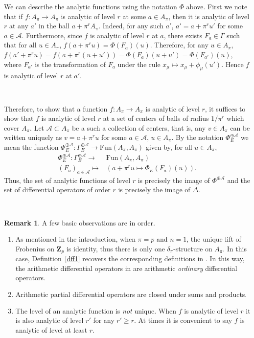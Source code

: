 \documentclass[10pt]{amsart}
\theoremstyle{Theorem}
\theoremstyle{definition}
\newtheorem{rmk}[thm]{Remark}
\newcommand{\ZZ}{\mathbf Z}
\newcommand{\cA}{\mathcal{A}}
\renewcommand{\d}{\delta}
\begin{document}
We can describe the analytic functions using the notation $\Phi$ above.  First we note that if $f\colon A_\pi\to A_\pi$ is analytic of level $r$ at some $a\in A_\pi$, then it is analytic of level $r$ at any $a'$ in the ball $a + \pi^rA_\pi$.  Indeed, for any such $a'$, $a' = a+ \pi^r u'$ for some $a\in \cA$.  Furthermore, since $f$ is analytic of level $r$ at $a$, there exists $F_a\in \Gamma$ such that for all $u\in A_\pi$, $f(a+\pi^r u) = \Phi(F_a)(u)$.  Therefore, for any $u\in A_\pi$, $f(a'+\pi^r u) = f(a+\pi^r(u + u')) = \Phi(F_a)(u + u') = \Phi(F_{a'})(u)$, where $F_{a'}$ is the transformation of $F_a$ under the rule $x_\mu \mapsto x_\mu + \phi_\mu(u')$.  Hence $f$ is analytic of level $r$ at $a'$.

\ 

Therefore, to show that a function $f:A_\pi\to A_\pi$ is analytic of level $r$, it suffices to show that $f$ is analytic of level $r$ at a set of centers of balls of radius $1/\pi^r$ which cover $A_\pi$.  Let $\cA\subset A_\pi$ be a such a collection of centers, that is, any $v\in A_\pi$ can be written uniquely as $v = a+\pi^r u$ for some $a\in \cA$, $u\in A_\pi$.  By the notation $\Phi_E^{\oplus \cA}$ we mean the function
$\Phi_E^{\oplus \cA} \colon \Gamma_E^{\oplus \cA}\to \mathrm{Fun}(A_\pi,A_\pi)$
given by, for all $u\in A_\pi$,
\begin{align*} 
\Phi_E^{\oplus \cA} \colon \Gamma_E^{\oplus \cA} \to & \mathrm{Fun}(A_\pi,A_\pi) \\ 
(F_a)_{a\in \cA}\mapsto & \left(a + \pi^r u \mapsto \Phi_E(F_a)(u)\right).
\end{align*}
Thus, the set of analytic functions of level $r$ is precisely the image of $\Phi^{\oplus \cA}$ and the set of differential operators of order $r$ is precisely the image of $\Delta$.

\


\begin{rmk}\label{rmk:basicob} A few basic observations are in order.
\begin{enumerate}
\item As mentioned in the introduction, when $\pi = p$ and $n = 1$, the unique lift of Frobenius on $\ZZ_p$ is identity, thus there is only one $\d_\pi$-structure on $A_\pi$. In this case, Definition~\ref{dff1} recovers the corresponding definitions in \cite{BRS11}. In this way, the arithmetic differential operators in \cite{BRS11} are arithmetic {\it ordinary} differential operators. 
\item Arithmetic partial differential operators are closed under sums and products. 
\item The level of an analytic function is {\it not} unique. When $f$ is analytic of level $r$ it is also analytic of level $r'$ for any $r' \geq r$. At times it is convenient to say $f$ is analytic of level at least $r$. 
\end{enumerate}
\end{rmk}
\end{document}
